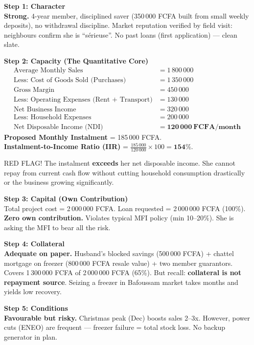 \documentclass[11pt]{article}
\newcommand{\cle}[1]{{\popxbold\color{popdark}#1}}
\begin{document}
\begin{exoresolu}
\textbf{Step 1: Character} \\
\textbf{Strong.} 4-year member, disciplined saver (350\,000 FCFA built from small weekly deposits), no withdrawal discipline. Market reputation verified by field visit: neighbours confirm she is ``sérieuse''. No past loans (first application) — clean slate.

\textbf{Step 2: Capacity (The Quantitative Core)} \\
\begin{align*}
\text{Average Monthly Sales} &= 1\,800\,000 \\
\text{Less: Cost of Goods Sold (Purchases)} &= 1\,350\,000 \\
\text{Gross Margin} &= 450\,000 \\
\text{Less: Operating Expenses (Rent + Transport)} &= 130\,000 \\
\text{Net Business Income} &= 320\,000 \\
\text{Less: Household Expenses} &= 200\,000 \\
\text{Net Disposable Income (NDI)} &= \mathbf{120\,000\ FCFA/month}
\end{align*}
\textbf{Proposed Monthly Instalment} = 185\,000 FCFA. \\
\textbf{Instalment-to-Income Ratio (IIR)} = $\frac{185\,000}{120\,000} \times 100 = \mathbf{154\%}$.

\cle{RED FLAG!} The instalment \textbf{exceeds} her net disposable income. She cannot repay from current cash flow without cutting household consumption drastically or the business growing significantly.

\textbf{Step 3: Capital (Own Contribution)} \\
Total project cost = 2\,000\,000 FCFA. Loan requested = 2\,000\,000 FCFA (100\%). \textbf{Zero own contribution.} Violates typical MFI policy (min 10--20\%). She is asking the MFI to bear all the risk.

\textbf{Step 4: Collateral} \\
\textbf{Adequate on paper.} Husband's blocked savings (500\,000 FCFA) + chattel mortgage on freezer (800\,000 FCFA resale value) + two member guarantors. Covers 1\,300\,000 FCFA of 2\,000\,000 FCFA (65\%). But recall: \textbf{collateral is not repayment source}. Seizing a freezer in Bafoussam market takes months and yields low recovery.

\textbf{Step 5: Conditions} \\
\textbf{Favourable but risky.} Christmas peak (Dec) boosts sales 2--3x. However, power cuts (ENEO) are frequent — freezer failure = total stock loss. No backup generator in plan.


\end{exoresolu}
\end{document}
